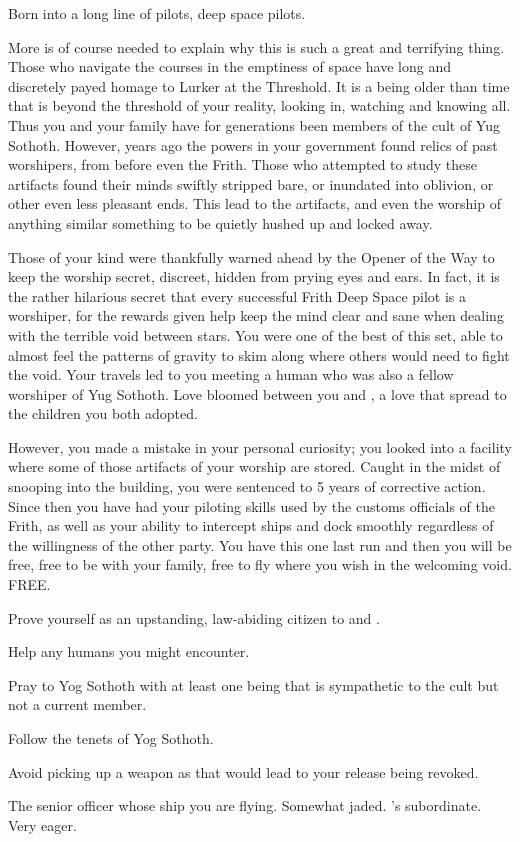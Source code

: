 \documentclass[char]{guildcamp4}
\begin{document}
\name{\cPilot{}}

Born into a long line of pilots, deep space pilots. 

More is of course needed to explain why this is such a great and terrifying thing.
Those who navigate the courses in the emptiness of space have long and discretely payed homage to Lurker at the Threshold. It is a being older than time that is beyond the threshold of your reality, looking in, watching and knowing all. Thus you and your family have for generations been members of the cult of Yug Sothoth. However, years ago the powers in your government found relics of past worshipers, from before even the Frith. Those who attempted to study these artifacts found their minds swiftly stripped bare, or inundated into oblivion, or other even less pleasant ends. This lead to the artifacts, and even the worship of anything similar something to be quietly hushed up and locked away. 

Those of your kind were thankfully warned ahead by the Opener of the Way to keep the worship secret, discreet, hidden from prying eyes and ears. 
In fact, it is the rather hilarious secret that every successful Frith Deep Space pilot is a worshiper, for the rewards given help keep the mind clear and sane when dealing with the terrible void between stars. You were one of the best of this set, able to almost feel the patterns of gravity to skim along where others would need to fight the void. Your travels led to you meeting a human who was also a fellow worshiper of Yug Sothoth.  Love bloomed between you and \cAlice{}, a love that spread to the children you both adopted. 

However, you made a mistake in your personal curiosity; you looked into a facility where some of those artifacts of your worship are stored. Caught in the midst of snooping into the building, you were sentenced to 5 years of corrective action. Since then you have had your piloting skills used by the customs officials of the Frith, as well as your ability to intercept ships and dock smoothly regardless of the willingness of the other party. 
You have this one last run and then you will be free, free to be with your family, free to fly where you wish in the welcoming void. FREE. 



\begin{itemz}[Goals]
	\item Prove yourself as an upstanding, law-abiding citizen to \cCbad{} and \cCgood{}.
	\item Help any humans you might encounter.
	\item Pray to Yog Sothoth with at least one being that is sympathetic to the cult but not a current member.
	\item Follow the tenets of Yog Sothoth.
	\item Avoid picking up a weapon as that would lead to your release being revoked.
\end{itemz}

\begin{contacts}
	\contact{\cCbad{}} The senior officer whose ship you are flying. Somewhat jaded.
	\contact{\cCgood{}} \cCbad{}'s subordinate. Very eager.
\end{contacts}
\end{document}
